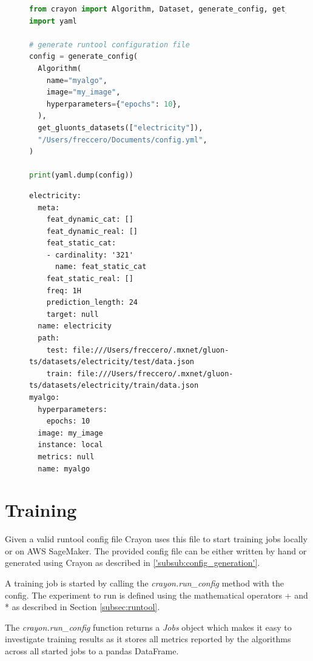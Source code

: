 \begin{figure}[h]
  \begin{lstlisting}[language=Python, label={code:config_generation_gluonts}, caption={Config generation using Crayon with gluonts datasets}]
from crayon import Algorithm, Dataset, generate_config, get_gluonts_datasets
import yaml

# generate runtool configuration file
config = generate_config(
  Algorithm(
    name="myalgo",
    image="my_image",
    hyperparameters={"epochs": 10},
  ),
  get_gluonts_datasets(["electricity"]),
  "/Users/freccero/Documents/config.yml",
)

print(yaml.dump(config))
    \end{lstlisting}
\end{figure}
\begin{figure}
  \begin{lstlisting}[label={output:config_generation_gluonts}, caption={Output when executing Code Fragment \ref{code:config_generation_gluonts}}]
electricity:
  meta:
    feat_dynamic_cat: []
    feat_dynamic_real: []
    feat_static_cat:
    - cardinality: '321'
      name: feat_static_cat
    feat_static_real: []
    freq: 1H
    prediction_length: 24
    target: null
  name: electricity
  path:
    test: file:///Users/freccero/.mxnet/gluon-ts/datasets/electricity/test/data.json
    train: file:///Users/freccero/.mxnet/gluon-ts/datasets/electricity/train/data.json
myalgo:
  hyperparameters:
    epochs: 10
  image: my_image
  instance: local
  metrics: null
  name: myalgo
    \end{lstlisting}
\end{figure}





\section{Training}
Given a valid runtool config file Crayon uses this file to start training jobs locally or on AWS SageMaker. The provided config file can be either written by hand or generated using Crayon as described in \ref{'subsub:config_generation'}.

A training job is started by calling the \textit{crayon.run\_config} method with the config. The experiment to run is defined using the mathematical operators + and * as described in Section \ref{subsec:runtool}.

The \textit{crayon.run\_config} function returns a \textit{Jobs} object which makes it easy to investigate training results as it stores all metrics reported by the algorithms across all started jobs to a pandas DataFrame.

